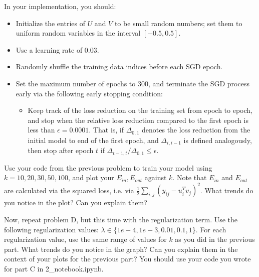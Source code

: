 In your implementation, you should:

\begin{itemize}
\item Initialize the entries of $U$ and $V$ to be small random numbers; set them to uniform random variables in the interval $[-0.5, 0.5]$.
\item Use a learning rate of 0.03.
\item Randomly shuffle the training data indices before each SGD epoch.
\item Set the maximum number of epochs to 300, and terminate the SGD process early via the following early stopping condition:
\begin{itemize}
\item Keep track of the loss reduction on the training set from epoch to epoch, and stop when the relative loss reduction compared to the first epoch is less than $\epsilon = 0.0001$.  That is, if $\Delta_{0,1}$ denotes the loss reduction from the initial model to end of the first epoch, and $\Delta_{i, i-1}$ is defined analogously, then stop after epoch $t$ if $\Delta_{t-1,t} / \Delta_{0,1} \leq \epsilon$.
\end{itemize}
\end{itemize}
\begin{solution}

\end{solution}

\problem[5]Use your code from the previous problem to train your model using $k=10, 20, 30, 50, 100$, and plot your $E_{in}, E_{out}$ against $k$. Note that $E_{in}$ and $E_{out}$ are calculated via the squared loss, i.e. via $\frac{1}{2}\sum_{i,j} \left( y_{ij} - u_i^Tv_j\right)^2$. What trends do you notice in the plot? Can you explain them?

\begin{solution}
\end{solution}

\problem[5]Now, repeat problem D, but this time with the regularization term. Use the following regularization values: $\lambda \in \{1e-4, 1e-3, 0.01, 0.1, 1\}$. For each regularization value, use the same range of values for $k$ as you did in the previous part. What trends do you notice in the graph? Can you explain them in the context of your plots for the previous part? You should use your code you wrote for part C in 2_notebook.ipynb.

\begin{solution}

\end{solution}

